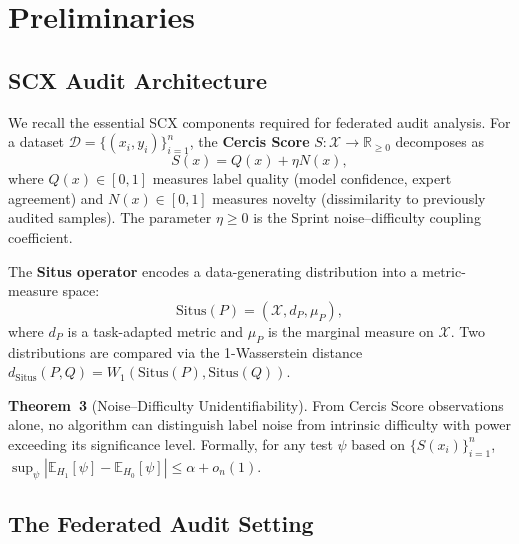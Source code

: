 \documentclass[12pt,a4paper]{article}
\newcommand{\R}{\mathbb{R}}
\newcommand{\E}{\mathbb{E}}
\newcommand{\cX}{\mathcal{X}}
\newcommand{\cD}{\mathcal{D}}
\newcommand{\Situs}{\mathrm{Situs}}
\begin{document}
\section{Preliminaries}

\subsection{SCX Audit Architecture}

We recall the essential SCX components required for federated audit analysis.
For a dataset $\cD = \{(x_i, y_i)\}_{i=1}^n$, the \textbf{Cercis Score}
$S: \cX \to \R_{\geq 0}$ decomposes as
\begin{equation}\label{eq:cercis}
    S(x) = Q(x) + \eta N(x),
\end{equation}
where $Q(x) \in [0,1]$ measures label quality (model confidence, expert
agreement) and $N(x) \in [0,1]$ measures novelty (dissimilarity to previously
audited samples).  The parameter $\eta \geq 0$ is the Sprint noise--difficulty
coupling coefficient.

The \textbf{Situs operator} encodes a data-generating distribution into a
metric-measure space:
\begin{equation}\label{eq:situs}
    \Situs(P) = (\cX, d_P, \mu_P),
\end{equation}
where $d_P$ is a task-adapted metric and $\mu_P$ is the marginal measure on
$\cX$.  Two distributions are compared via the 1-Wasserstein distance
$d_{\Situs}(P, Q) = W_1(\Situs(P), \Situs(Q))$.

\textbf{Theorem~3} (Noise--Difficulty Unidentifiability).  From Cercis Score
observations alone, no algorithm can distinguish label noise from intrinsic
difficulty with power exceeding its significance level.  Formally, for any
test $\psi$ based on $\{S(x_i)\}_{i=1}^n$,
$\sup_\psi |\E_{H_1}[\psi] - \E_{H_0}[\psi]| \leq \alpha + o_n(1)$.

\subsection{The Federated Audit Setting}
\end{document}
